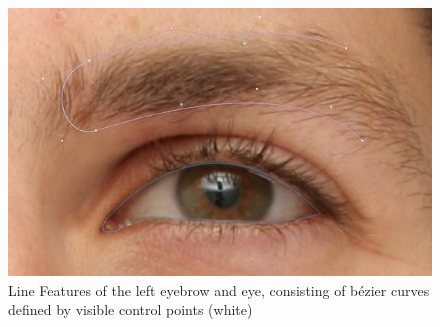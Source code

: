 \begin{figure}[h!]
    \centering
\includegraphics[width=\textwidth]{./resources/img/eyebrow_left.jpeg}
\caption{Line Features of the left eyebrow and eye, consisting of b\'{e}zier curves defined by visible control points (white)}
\end{figure}

